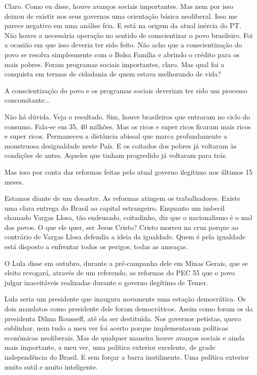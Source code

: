 \falaM Claro. Como eu disse, houve avanços sociais importantes. Mas nem por
isso deixou de existir nos seus governos uma orientação básica
neoliberal. Isso me parece negativo em uma análise fria. E está na
origem da atual inércia do PT. Não houve a necessária operação no
sentido de conscientizar o povo brasileiro. Foi a ocasião em que isso
deveria ter sido feito. Não acho que a conscientização do povo se
resolva simplesmente com o Bolsa Família e abrindo o crédito para os
mais pobres. Foram programas sociais importantes, claro. Mas qual foi a
conquista em termos de cidadania de quem estava melhorando de vida?

\falaG A conscientização do povo e os programas sociais deveriam ter sido um
processo concomitante...

\falaM Não há dúvida. Veja o resultado. Sim, houve brasileiros que entraram
no ciclo do consumo. Fala-se em 35, 40 milhões. Mas os ricos e super
ricos ficaram mais ricos e super ricos. Permaneceu a distância abissal
que marca profundamente a monstruosa desigualdade neste País. E os
coitados dos pobres já voltaram às condições de antes. Aqueles que
tinham progredido já voltaram para trás.

\falaG Mas isso por conta das reformas feitas pelo atual governo ilegítimo
nos últimos 15 meses.

\falaM Estamos diante de um desastre. As reformas atingem os trabalhadores.
Existe uma clara entrega do Brasil ao capital estrangeiro. Enquanto um
imbecil chamado Vargas Llosa, tão endeusado, coitadinho, diz que o
nacionalismo é o mal dos povos. O que ele quer, ser Jesus Cristo? Cristo
morreu na cruz porque ao contrário de Vargas Llosa defendia a ideia da
igualdade. Quem é pela igualdade está disposto a enfrentar todos os
perigos, todas as ameaças.

\falaG O Lula disse em outubro, durante a pré-campanha dele em Minas Gerais,
que se eleito revogará, através de um referendo, as reformas do PEC 55
que o povo julgar inaceitáveis realizadas durante o governo ilegítimo de
Temer.

\falaM Lula seria um presidente que inaugura novamente uma estação
democrática. Os dois mandatos como presidente dele foram democráticos.
Assim como foram os da presidenta Dilma Rousseff, até ela ser
destituída. Nos governos petistas, quero sublinhar, nem tudo a meu ver
foi acerto porque implementaram políticas econômicas neoliberais. Mas de
qualquer maneira houve avanços sociais e ainda mais importante, a meu
ver, uma política exterior excelente, de grade independência do Brasil.
E sem forçar a barra inutilmente. Uma política exterior muito sutil e
muito inteligente.

